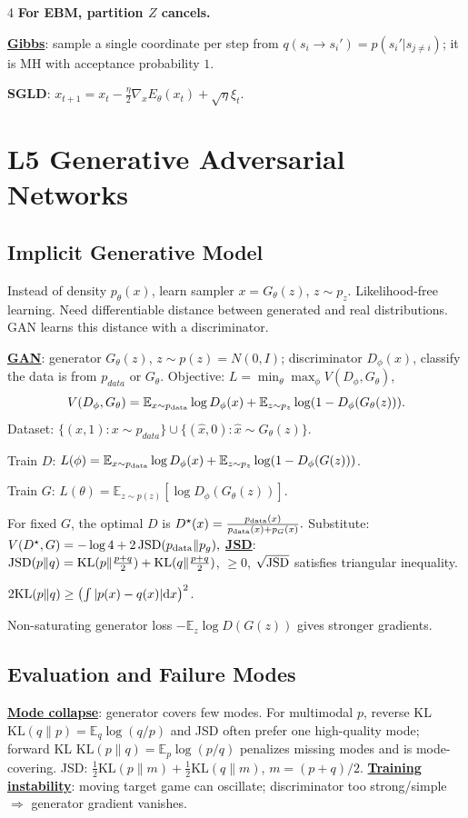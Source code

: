 \documentclass{article}
\newcommand{\key}[1]{\textbf{#1}}
\newcommand{\lowterm}[1]{\textbf{\underline{#1}}}
\newcommand{\E}{\mathbb{E}}
\newcommand{\KL}{\mathrm{KL}}
\newcommand{\1}{\mathbf 1}
\newcommand{\dd}{\mathrm{d}}
\begin{document}
\begin{multicols*}{4}
\key{For EBM, partition $Z$ cancels. }

\lowterm{Gibbs}: sample a single coordinate per step from $q(s_i\to s_i')=p(s_i'|s_{j\ne i})$; it is MH with acceptance probability $1$. 

\key{SGLD}: $x_{t+1}=x_t-\frac{\eta}{2}\nabla_xE_\theta(x_t)+\sqrt{\eta}\xi_t$.

\section{L5 Generative Adversarial Networks}
\subsection{Implicit Generative Model}
Instead of density $p_\theta(x)$, learn sampler $x=G_\theta(z)$, $z\sim p_z$. Likelihood-free learning. Need differentiable distance between generated and real distributions. GAN learns this distance with a discriminator.

\lowterm{GAN}: generator $G_\theta(z)$, $z\sim p(z)=N(0,I)$; discriminator $D_\phi(x)$, classify the data is from $p_{data}$ or $G_\theta$. Objective: $L=\min_\theta\max_\phi V(D_\phi,G_\theta)$, 
\[
V(D_\phi,G_\theta)=\E_{x\sim p_{\rm data}}\log D_\phi(x)+\E_{z\sim p_z}\log(1-D_\phi(G_\theta(z))).
\]
Dataset: $\{(x,1):x\sim p_{data}\}\cup\{(\hat{x},0):\hat{x}\sim G_\theta(z)\}$.

Train $D$: $L(\phi)=\E_{x\sim p_{\rm data}}\log D_\phi(x)+\E_{z\sim p_z}\log(1-D_\phi(G(z)))$. 

Train $G$: $L(\theta)=\E_{z\sim p(z)}[\log D_\phi(G_\theta(z))]$.

For fixed $G$, the optimal $D$ is 
\(
D^\star(x)=\frac{p_{\rm data}(x)}{p_{\rm data}(x)+p_G(x)}.
\) 
Substitute:
\(
V(D^\star,G)=-\log4+2\,{\rm JSD}(p_{\rm data}\|p_g), 
\)
\lowterm{JSD}: ${\rm JSD}(p\|q)={\rm KL}(p\|\frac{p+q}{2})+{\rm KL}(q\|\frac{p+q}{2})$, $\geq 0$, $\sqrt{\rm JSD}$ satisfies triangular inequality. 

$2{\rm KL}(p\|q)\geq \left(\int |p(x)-q(x)|\dd x\right)^2$. 

Non-saturating generator loss $-\E_z\log D(G(z))$ gives stronger gradients.

\subsection{Evaluation and Failure Modes}
\lowterm{Mode collapse}: generator covers few modes. For multimodal $p$, reverse KL $\KL(q\|p)=\E_q\log(q/p)$ and JSD often prefer one high-quality mode; forward KL $\KL(p\|q)=\E_p\log(p/q)$ penalizes missing modes and is mode-covering. JSD: $\frac12\KL(p\|m)+\frac12\KL(q\|m)$, $m=(p+q)/2$. \lowterm{Training instability}: moving target game can oscillate; discriminator too strong/simple $\Rightarrow$ generator gradient vanishes.


\end{multicols*}
\end{document}
